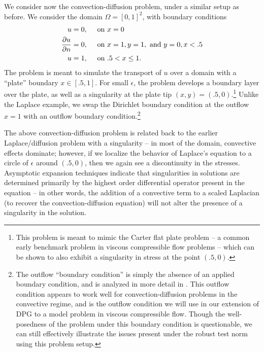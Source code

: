 We consider now the convection-diffusion problem, under a similar setup as before.  We consider the domain $\Omega = [0,1]^2$, with boundary conditions
\begin{align*}
u &= 0,\quad \text{ on } x = 0\\
\pd{u}{n} &= 0,\quad \text{ on } x = 1, y = 1, \text{ and } y = 0, x < .5\\
u &= 1,\quad \text{ on } .5 < x \leq 1.
\end{align*}
The problem is meant to simulate the transport of $u$ over a domain with a ``plate'' boundary $x \in [.5,1]$.  For small $\epsilon$, the problem develops a boundary layer over the plate, as well as a singularity at the plate tip $(x,y) = (.5,0)$.\footnote{This problem is meant to mimic the Carter flat plate problem -- a common early benchmark problem in viscous compressible flow problems -- which can be shown to also exhibit a singularity in stress at the point $(.5,0)$.}  Unlike the Laplace example, we swap the Dirichlet boundary condition at the outflow $x=1$ with an outflow boundary condition.\footnote{The outflow ``boundary condition'' is simply the absence of an applied boundary condition, and is analyzed in more detail in \cite{FLD:FLD505}.  This outflow condition appears to work well for convection-diffusion problems in the convective regime, and is the outflow condition we will use in our extension of DPG to a model problem in viscous compressible flow.  Though the well-posedness of the problem under this boundary condition is questionable, we can still effectively illustrate the issues present under the robust test norm using this problem setup.  }

The above convection-diffusion problem is related back to the earlier Laplace/diffusion problem with a singularity -- in most of the domain, convective effects dominate; however, if we  localize the behavior of Laplace's equation to a circle of $\epsilon$ around $(.5,0)$, then we again see a discontinuity in the stresses.  Asymptotic expansion techniques indicate that singularities in solutions are determined primarily by the highest order differential operator present in the equation -- in other words, the addition of a convective term to a scaled Laplacian (to recover the convection-diffusion equation) will not alter the presence of a singularity in the solution.  


